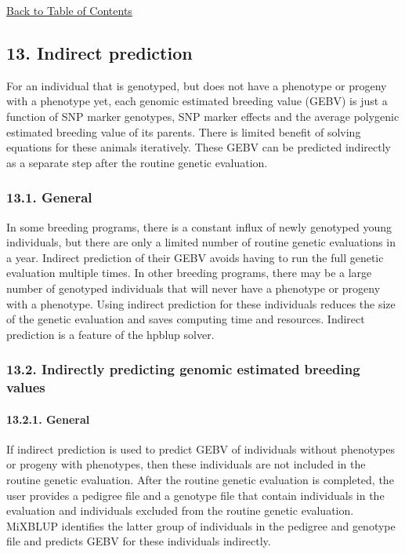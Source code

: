 \hyperref[Tabl01]{Back to Table of Contents}

\newpage

\subsection{13. Indirect prediction}\label{Indi01}

For an individual that is genotyped, but does not have a phenotype or
progeny with a phenotype yet, each genomic estimated breeding value
(GEBV) is just a function of SNP marker genotypes, SNP marker effects
and the average polygenic estimated breeding value of its parents. There
is limited benefit of solving equations for these animals iteratively.
These GEBV can be predicted indirectly as a separate step after the
routine genetic evaluation.

\subsubsection{13.1. General}\label{Indi02}

In some breeding programs, there is a constant influx of newly genotyped
young individuals, but there are only a limited number of routine
genetic evaluations in a year. Indirect prediction of their GEBV avoids
having to run the full genetic evaluation multiple times. In other
breeding programs, there may be a large number of genotyped individuals
that will never have a phenotype or progeny with a phenotype. Using
indirect prediction for these individuals reduces the size of the
genetic evaluation and saves computing time and resources. Indirect
prediction is a feature of the hpblup solver.

\subsubsection{13.2. Indirectly predicting genomic estimated breeding
values}\label{Indi03}

\paragraph{13.2.1. General}\label{Indi04}

If indirect prediction is used to predict GEBV of individuals without
phenotypes or progeny with phenotypes, then these individuals are not
included in the routine genetic evaluation. After the routine genetic
evaluation is completed, the user provides a pedigree file and a
genotype file that contain individuals in the evaluation and individuals
excluded from the routine genetic evaluation. MiXBLUP identifies the
latter group of individuals in the pedigree and genotype file and
predicts GEBV for these individuals indirectly.

